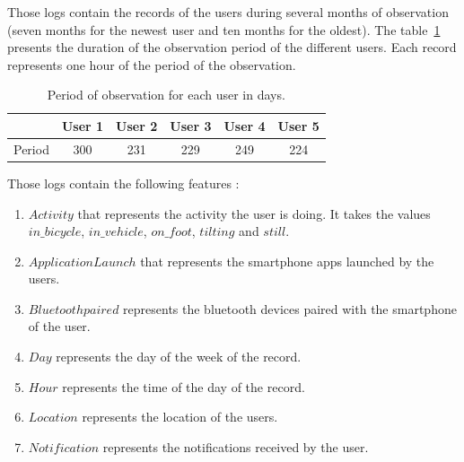 \noindent
Those logs contain the records of the users during several months of observation (seven months for the newest user and ten months for the oldest). The table~\ref{duration} presents the duration of the observation period of the different users. Each record represents one hour of the period of the observation.

\begin{table}[H] 
\caption {Period of observation for each user in days.} 
\label{duration}
\begin{tabular}{|l|c|c|c|c|c|}
  \hline
  &User 1 & User 2 & User 3 & User 4 & User 5 \\
 \hline
  Period & 300 & 231 & 229 & 249 &  224 \\
 \hline
\end{tabular}
\end{table}

Those logs contain the following features :

\begin{enumerate}
\item $Activity$ that represents the activity the user is doing. It takes the values $in\_bicycle$, $in\_vehicle$, $on\_foot$, $tilting$ and $still$.
\item $Application Launch$ that represents the smartphone apps launched by the users.
\item $Bluetooth paired$ represents the bluetooth devices paired with the smartphone of the user.
\item $Day$ represents the day of the week of the record.
\item $Hour$ represents the time of the day of the record.
\item $Location$ represents the location of the users.
\item $Notification$ represents the notifications received by the user.
\end{enumerate}

